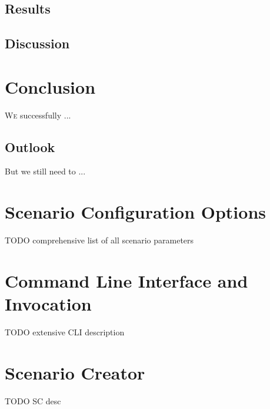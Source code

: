 \documentclass[%
    ]{\PathToTumTemplate/thesis/tum_thesis}
\begin{document}
\section{Results}\label{sec:results}

\section{Discussion}\label{sec:discussion}







\chapter{Conclusion} \label{chap:conclusion}
 
\lettrine{W}{e} successfully ...




\section{Outlook}\label{sec:outlook}

But we still need to ...






\begin{appendix}
\chapter{Scenario Configuration Options}\label{appendix:scenarios}
TODO comprehensive list of all scenario parameters

\chapter{Command Line Interface and Invocation}\label{appendix:cli_invocation}
TODO extensive CLI description

\chapter{Scenario Creator}\label{appendix:sc}
TODO SC desc

\end{appendix}
\end{document}
